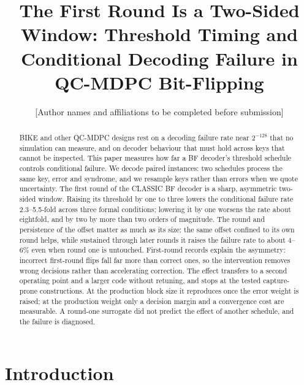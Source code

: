\documentclass[runningheads,a4paper]{llncs}
\begin{document}
\sloppy

\title{The First Round Is a Two-Sided Window: Threshold Timing and
Conditional Decoding Failure in QC-MDPC Bit-Flipping}

\author{[Author names and affiliations to be completed before submission]}

\maketitle

\begin{abstract}
BIKE and other QC-MDPC designs rest on a decoding failure rate near $2^{-128}$ that no simulation can measure, and on decoder behaviour that must hold across keys that cannot be inspected. This paper measures how far a BF decoder's threshold schedule controls conditional failure. We decode paired instances: two schedules process the same key, error and syndrome, and we resample keys rather than errors when we quote uncertainty. The first round of the CLASSIC BF decoder is a sharp, asymmetric two-sided window. Raising its threshold by one to three lowers the conditional failure rate 2.3--5.5-fold across three formal conditions; lowering it by one worsens the rate about eightfold, and by two by more than two orders of magnitude. The round and persistence of the offset matter as much as its size: the same offset confined to its own round helps, while sustained through later rounds it raises the failure rate to about 4--6\% even when round one is untouched. First-round records explain the asymmetry: incorrect first-round flips fall far more than correct ones, so the intervention removes wrong decisions rather than accelerating correction. The effect transfers to a second operating point and a larger code without retuning, and stops at the tested capture-prone constructions. At the production block size it reproduces once the error weight is raised; at the production weight only a decision margin and a convergence cost are measurable. A round-one surrogate did not predict the effect of another schedule, and the failure is diagnosed.
\end{abstract}

\section{Introduction}\label{sec:intro}
\end{document}
